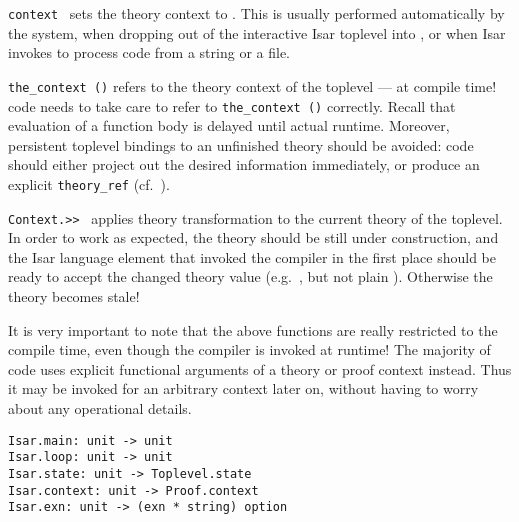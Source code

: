\begin{isabellebody}
\begin{isamarkuptext}
  \begin{description}

  \item \verb|context|~ sets the {\ML} theory context to
  .  This is usually performed automatically by the system,
  when dropping out of the interactive Isar toplevel into {\ML}, or
  when Isar invokes {\ML} to process code from a string or a file.

  \item \verb|the_context ()| refers to the theory context of the
  {\ML} toplevel --- at compile time!  {\ML} code needs to take care
  to refer to \verb|the_context ()| correctly.  Recall that
  evaluation of a function body is delayed until actual runtime.
  Moreover, persistent {\ML} toplevel bindings to an unfinished theory
  should be avoided: code should either project out the desired
  information immediately, or produce an explicit \verb|theory_ref| (cf.\ ).

  \item \verb|Context.>>|~ applies theory transformation
   to the current theory of the {\ML} toplevel.  In order to
  work as expected, the theory should be still under construction, and
  the Isar language element that invoked the {\ML} compiler in the
  first place should be ready to accept the changed theory value
  (e.g.\ , but not plain ).
  Otherwise the theory becomes stale!

  \end{description}

  It is very important to note that the above functions are really
  restricted to the compile time, even though the {\ML} compiler is
  invoked at runtime!  The majority of {\ML} code uses explicit
  functional arguments of a theory or proof context instead.  Thus it
  may be invoked for an arbitrary context later on, without having to
  worry about any operational details.

  \bigskip

  \begin{mldecls}
  \verb|Isar.main: unit -> unit| \\
  \verb|Isar.loop: unit -> unit| \\
  \verb|Isar.state: unit -> Toplevel.state| \\
  \verb|Isar.context: unit -> Proof.context| \\
  \verb|Isar.exn: unit -> (exn * string) option| \\
  \end{mldecls}


\end{isamarkuptext}
\end{isabellebody}
